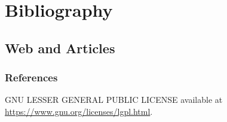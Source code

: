 \section{Bibliography}
\subsection*{Web and Articles}

\begin{frame}[allowframebreaks]
	\frametitle<presentation>{References}
	
		\begin{thebibliography}{10}
				GNU LESSER GENERAL PUBLIC LICENSE
				\newblock available at \url{https://www.gnu.org/licenses/lgpl.html}.
	\end{thebibliography}
\end{frame}
